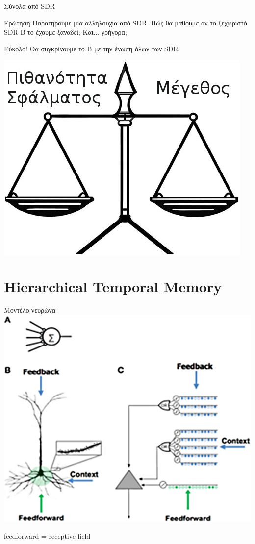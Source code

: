 \documentclass[11pt,center]{beamer}
\begin{document}

\begin{frame} {Σύνολα από SDR}
  \begin{block}{Ερώτηση}
    Παρατηρούμε μια αλληλουχία από SDR. Πώς θα μάθουμε αν το ξεχωριστό SDR Β το έχουμε ξαναδεί; Και... γρήγορα;
  \end{block}

  \pause
  \vspace{1em}
  \begin{block}{Εύκολο!}
	Θα συγκρίνουμε το Β με την \alert{ένωση} όλων των SDR
  \end{block}

  \pause
  \vspace{0.5em}
  \centering
  \includegraphics[width=.5\textwidth]{../pics/balance}
\end{frame}

\section{Hierarchical Temporal Memory}

\begin{frame}{Μοντέλο νευρώνα}
  \centering
  \includegraphics[width=.75\textwidth]{../pics/neuron-model}

  feedforward = receptive field
\end{frame}
\end{document}

